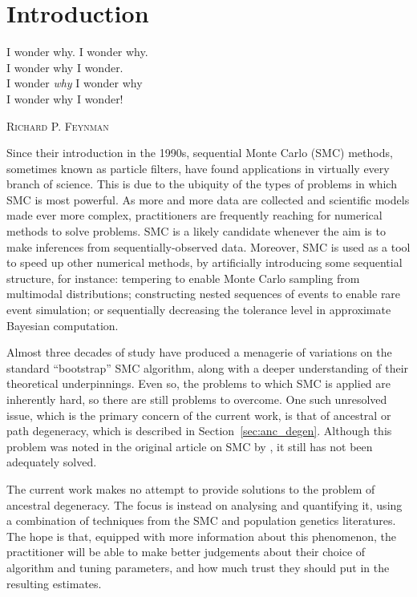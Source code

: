 \chapter{Introduction}

\epigraph{
I wonder why. I wonder why.\\
I wonder why I wonder.\\
I wonder \emph{why} I wonder why\\
I wonder why I wonder!
}
{\textsc{Richard P. Feynman}}

Since their introduction in the 1990s, sequential Monte Carlo (SMC) methods, sometimes known as particle filters, have found applications in virtually every branch of science. 
This is due to the ubiquity of the types of problems in which SMC is most powerful.
As more and more data are collected and scientific models made ever more complex, practitioners are frequently reaching for numerical methods to solve problems.
SMC is a likely candidate whenever the aim is to make inferences from sequentially-observed data.
Moreover, SMC is used as a tool to speed up other numerical methods, by artificially introducing some sequential structure, for instance: tempering to enable Monte Carlo sampling from multimodal distributions; constructing nested sequences of events to enable rare event simulation; or sequentially decreasing the tolerance level in approximate Bayesian computation.

Almost three decades of study have produced a menagerie of variations on the standard ``bootstrap'' SMC algorithm, along with a deeper understanding of their theoretical underpinnings.
Even so, the problems to which SMC is applied are inherently hard,
so there are still problems to overcome.
One such unresolved issue, which is the primary concern of the current work, is that of ancestral or path degeneracy, which is described in Section~\ref{sec:anc_degen}. Although this problem was noted in the original article on SMC by \textcite{gordon1993}, it still has not been adequately solved.

The current work makes no attempt to provide solutions to the problem of ancestral degeneracy. The focus is instead on analysing and quantifying it, using a combination of techniques from the SMC and population genetics literatures. 
The hope is that, equipped with more information about this phenomenon, the practitioner will be able to make better judgements about their choice of algorithm and tuning parameters, and how much trust they should put in the resulting estimates.
\\[10pt]

